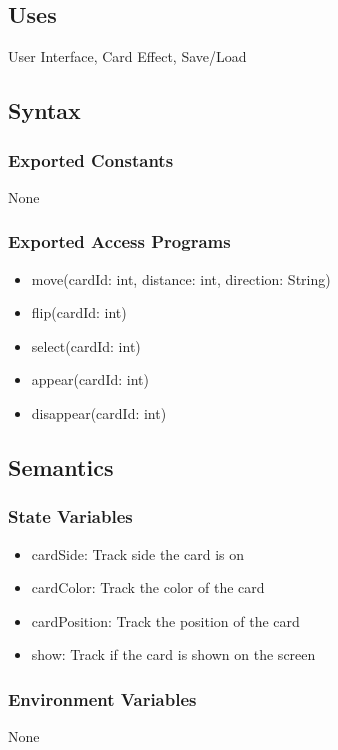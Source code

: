 \documentclass[12pt, titlepage]{article}
\begin{document}
\subsection{Uses}
\hspace{1.5em}User Interface, Card Effect, Save/Load

\subsection{Syntax}

\subsubsection{Exported Constants}
\hspace{1.5em}None

\subsubsection{Exported Access Programs}

\begin{itemize}
\item move(cardId: int, distance: int, direction: String)
\item flip(cardId: int)
\item select(cardId: int)
\item appear(cardId: int)
\item disappear(cardId: int)
\end{itemize}

\subsection{Semantics}

\subsubsection{State Variables}
\begin{itemize}
\item cardSide: Track side the card is on
\item cardColor: Track the color of the card
\item cardPosition: Track the position of the card 
\item show: Track if the card is shown on the screen
\end{itemize}

\subsubsection{Environment Variables}
\hspace{1.5em}None
\end{document}
